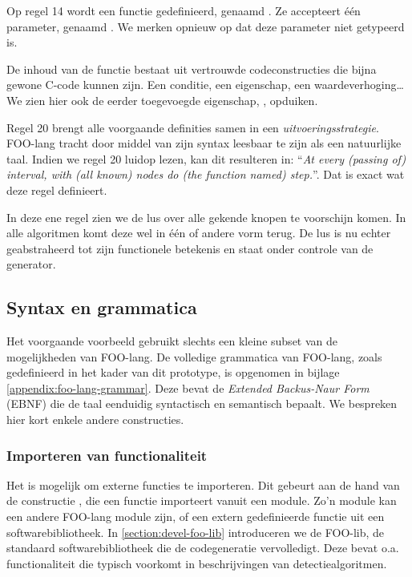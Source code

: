 Op regel 14 wordt een functie gedefinieerd, genaamd . Ze accepteert
\'e\'en parameter, genaamd . We merken opnieuw op dat deze parameter
niet getypeerd is.

De inhoud van de functie bestaat uit vertrouwde codeconstructies die bijna
gewone C-code kunnen zijn. Een conditie, een eigenschap, een
waardeverhoging\dots We zien hier ook de eerder toegevoegde eigenschap,
, opduiken.

Regel 20 brengt alle voorgaande definities samen in een
\emph{uitvoeringsstrategie}. FOO-lang tracht door middel van zijn syntax
leesbaar te zijn als een natuurlijke taal. Indien we regel 20 luidop lezen, kan
dit resulteren in: ``\emph{At every (passing of) interval, with (all known)
nodes do (the function named) step.}''. Dat is exact wat deze regel definieert.

In deze ene regel zien we de lus over alle gekende knopen te voorschijn komen.
In alle algoritmen komt deze wel in \'e\'en of andere vorm terug. De lus is nu
echter geabstraheerd tot zijn functionele betekenis en staat onder controle van
de generator.

\subsection{Syntax en grammatica}
\label{subsection:devel-foo-lang-grammar}

Het voorgaande voorbeeld gebruikt slechts een kleine subset van de
mogelijkheden van FOO-lang. De volledige grammatica van FOO-lang, zoals
gedefinieerd in het kader van dit prototype, is opgenomen in bijlage
\ref{appendix:foo-lang-grammar}. Deze bevat de \emph{Extended Backus-Naur Form}
(EBNF) die de taal eenduidig syntactisch en semantisch bepaalt. We bespreken
hier kort enkele andere constructies.

\vspace{-3mm}

\subsubsection{Importeren van functionaliteit}

Het is mogelijk om externe functies te importeren. Dit gebeurt aan de hand van
de constructie , die een functie importeert vanuit
een module. Zo'n module kan een andere FOO-lang module zijn, of een extern
gedefinieerde functie uit een softwarebibliotheek. In
\ref{section:devel-foo-lib} introduceren we de FOO-lib, de standaard
softwarebibliotheek die de codegeneratie vervolledigt. Deze bevat o.a.
functionaliteit die typisch voorkomt in beschrijvingen van detectiealgoritmen.

